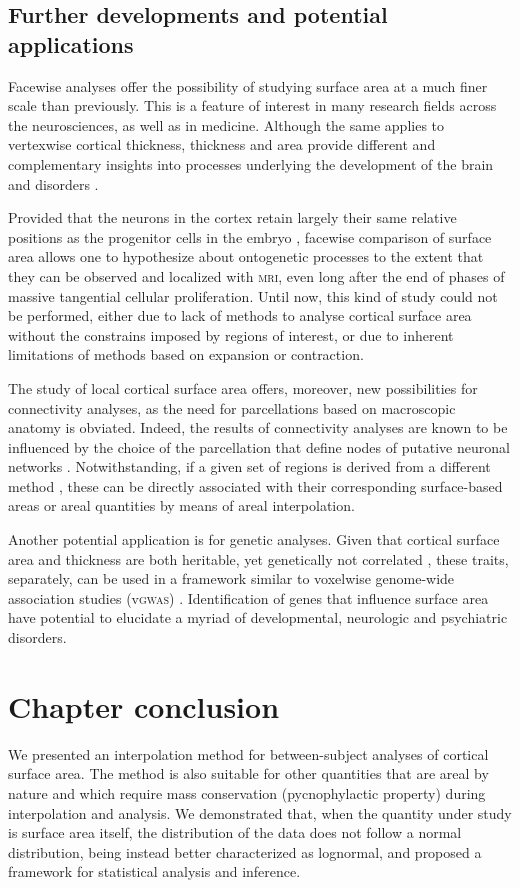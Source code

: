 \subsection{Further developments and potential applications}

Facewise analyses offer the possibility of studying surface area at a much finer scale than previously. This is a feature of interest in many research fields across the neurosciences, as well as in medicine. Although the same applies to vertexwise cortical thickness, thickness and area provide different and complementary insights into processes underlying the development of the brain and disorders \citep{Voets2008, Winkler2010, SanabriaDiaz2010}.

Provided that the neurons in the cortex retain largely their same relative positions as the progenitor cells in the embryo \citep{Rakic1988, Rakic2009a, Pierani2009, Clowry2010}, facewise comparison of surface area allows one to hypothesize about ontogenetic processes to the extent that they can be observed and localized with \textsc{mri}, even long after the end of phases of massive tangential cellular proliferation. Until now, this kind of study could not be performed, either due to lack of methods to analyse cortical surface area without the constrains imposed by regions of interest, or due to inherent limitations of methods based on expansion or contraction.

The study of local cortical surface area offers, moreover, new possibilities for connectivity analyses, as the need for parcellations based on macroscopic anatomy is obviated. Indeed, the results of connectivity analyses are known to be influenced by the choice of the parcellation that define nodes of putative neuronal networks \citep{Butts2009, Rubinov2010}. Notwithstanding, if a given set of regions is derived from a different method \citep{Beckmann2009a, Nelson2010}, these can be directly associated with their corresponding surface-based areas or areal quantities by means of areal interpolation.

Another potential application is for genetic analyses. Given that cortical surface area and thickness are both heritable, yet genetically not correlated \citep{Panizzon2009, Winkler2010}, these traits, separately, can be used in a framework similar to voxelwise genome-wide association studies (v\textsc{gwas}) \citep{Stein2010}. Identification of genes that influence surface area have potential to elucidate a myriad of developmental, neurologic and psychiatric disorders.

\section{Chapter conclusion}

We presented an interpolation method for between-subject analyses of cortical surface area. The method is also suitable for other quantities that are areal by nature and which require mass conservation (pycnophylactic property) during interpolation and analysis. We demonstrated that, when the quantity under study is surface area itself, the distribution of the data does not follow a normal distribution, being instead better characterized as lognormal, and proposed a framework for statistical analysis and inference.